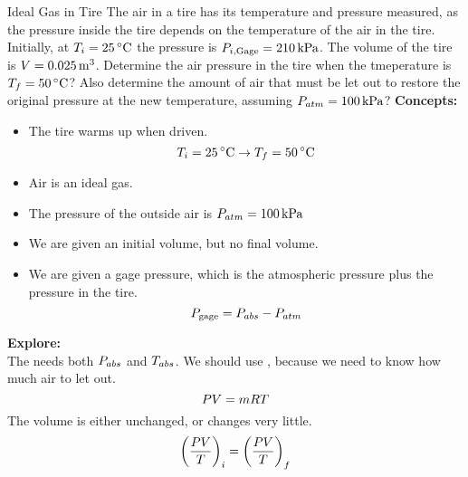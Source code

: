 \begin{example}[Problem 4.79]{Ideal Gas in Tire}
  The air in a tire has its temperature and pressure measured, as the pressure inside the tire depends on the temperature of the air in the tire.
  Initially, at $\Temp_{i} = \SI{25}{\degreeCelsius}$ the pressure is $P_{i, \text{Gage}} = \SI{210}{\kilo\pascal}$.
  The volume of the tire is $V = \SI{0.025}{\meter\cubed}$.
  Determine the air pressure in the tire when the tmeperature is $\Temp_{f} = \SI{50}{\degreeCelsius}$?
  Also determine the amount of air that must be let out to restore the original pressure at the new temperature, assuming $P_{atm} = \SI{100}{\kilo\pascal}$?
  \tcblower{}
  \textbf{Concepts:} \\
  \begin{itemize}[noitemsep]
  \item The tire warms up when driven.
    \begin{equation*}
      \Temp_{i} = \SI{25}{\degreeCelsius} \to \Temp_{f} = \SI{50}{\degreeCelsius}
    \end{equation*}
  \item Air is an ideal gas.
  \item The pressure of the outside air is $P_{atm} = \SI{100}{\kilo\pascal}$
  \item We are given an initial volume, but no final volume.
  \item We are given a gage pressure, which is the atmospheric pressure plus the pressure in the tire.
    \begin{equation*}
      P_{\text{gage}} = P_{abs} - P_{atm}
    \end{equation*}
  \end{itemize}

  \textbf{Explore:} \\
  The  needs both $P_{abs}$ and $T_{abs}$.
  We should use , because we need to know how much air to let out.
  \begin{equation*}
    P V = m R T
  \end{equation*}
  The volume is either unchanged, or changes very little.
  \begin{equation*}
    {\left( \frac{\ensuremath{P}\ensuremath{V}}{\ensuremath{T}} \right)}_{i} = {\left( \frac{P V}{T} \right)}_{f}
  \end{equation*}
\end{example}

